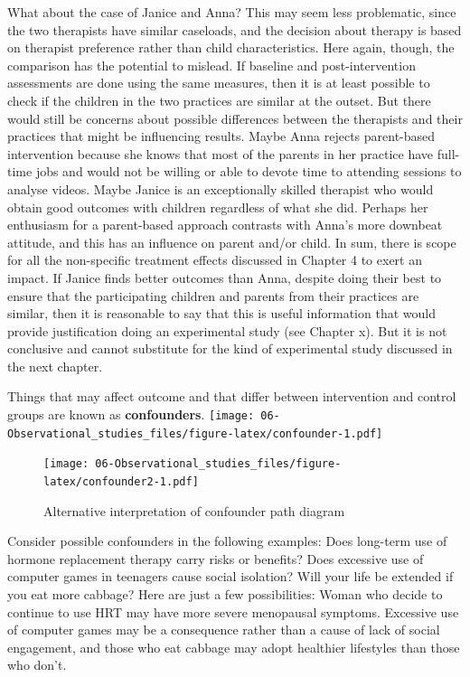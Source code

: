 \documentclass[]{book}
\begin{document}
What about the case of Janice and Anna? This may seem less problematic, since the two therapists have similar caseloads, and the decision about therapy is based on therapist preference rather than child characteristics. Here again, though, the comparison has the potential to mislead. If baseline and post-intervention assessments are done using the same measures, then it is at least possible to check if the children in the two practices are similar at the outset. But there would still be concerns about possible differences between the therapists and their practices that might be influencing results. Maybe Anna rejects parent-based intervention because she knows that most of the parents in her practice have full-time jobs and would not be willing or able to devote time to attending sessions to analyse videos. Maybe Janice is an exceptionally skilled therapist who would obtain good outcomes with children regardless of what she did. Perhaps her enthusiasm for a parent-based approach contrasts with Anna's more downbeat attitude, and this has an influence on parent and/or child. In sum, there is scope for all the non-specific treatment effects discussed in Chapter 4 to exert an impact. If Janice finds better outcomes than Anna, despite doing their best to ensure that the participating children and parents from their practices are similar, then it is reasonable to say that this is useful information that would provide justification doing an experimental study (see Chapter x). But it is not conclusive and cannot substitute for the kind of experimental study discussed in the next chapter.

Things that may affect outcome and that differ between intervention and control groups are known as \textbf{confounders}.
\texttt{[image: 06-Observational\_studies\_files/figure-latex/confounder-1.pdf]}

\begin{figure}
\centering
\texttt{[image: 06-Observational\_studies\_files/figure-latex/confounder2-1.pdf]}
\caption{\label{fig:confounder2}Alternative interpretation of confounder path diagram}
\end{figure}

Consider possible confounders in the following examples: Does long-term use of hormone replacement therapy carry risks or benefits? Does excessive use of computer games in teenagers cause social isolation? Will your life be extended if you eat more cabbage? Here are just a few possibilities: Woman who decide to continue to use HRT may have more severe menopausal symptoms. Excessive use of computer games may be a consequence rather than a cause of lack of social engagement, and those who eat cabbage may adopt healthier lifestyles than those who don't.
\end{document}
